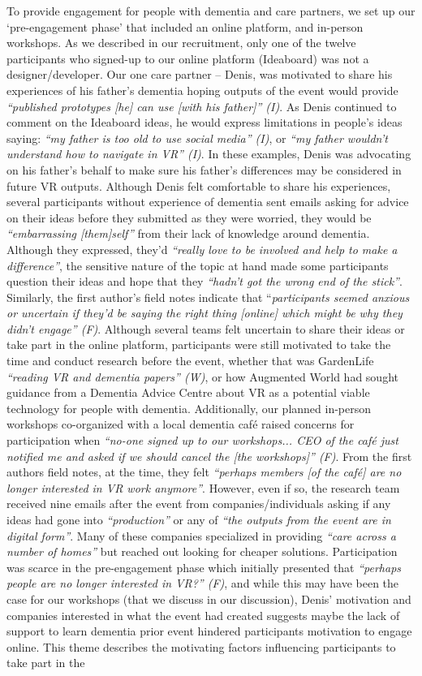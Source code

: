 To provide engagement for people with dementia and care partners, we set up our ‘pre-engagement phase’ that included an online platform, and in-person workshops. As we described in our recruitment, only one of the twelve participants who signed-up to our online platform (Ideaboard) was not a designer/developer. Our one care partner – Denis, was motivated to share his experiences of his father’s dementia hoping outputs of the event would provide \textit{“published prototypes [he] can use [with his father]” (I)}. As Denis continued to comment on the Ideaboard ideas, he would express limitations in people’s ideas saying:\textit{ “my father is too old to use social media” (I)}, or \textit{“my father wouldn’t understand how to navigate in VR” (I)}. In these examples, Denis was advocating on his father’s behalf to make sure his father’s differences may be considered in future VR outputs. Although Denis felt comfortable to share his experiences, several participants without experience of dementia sent emails asking for advice on their ideas before they submitted as they were worried, they would be \textit{“embarrassing [them]self” }from their lack of knowledge around dementia. Although they expressed, they’d \textit{“really love to be involved and help to make a difference”}, the sensitive nature of the topic at hand made some participants question their ideas and hope that they \textit{“hadn’t got the wrong end of the stick”}. Similarly, the first author’s field notes indicate that “\textit{participants seemed anxious or uncertain if they’d be saying the right thing [online] which might be why they didn’t engage” (F)}. Although several teams felt uncertain to share their ideas or take part in the online platform, participants were still motivated to take the time and conduct research before the event, whether that was GardenLife \textit{“reading VR and dementia papers” (W)}, or how Augmented World had sought guidance from a Dementia Advice Centre about VR as a potential viable technology for people with dementia. Additionally, our planned in-person workshops co-organized with a local dementia café raised concerns for participation when \textit{“no-one signed up to our workshops... CEO of the café just notified me and asked if we should cancel the [the workshops]” (F)}. From the first authors field notes, at the time, they felt \textit{“perhaps members [of the café] are no longer interested in VR work anymore”}. However, even if so, the research team received nine emails after the event from companies/individuals asking if any ideas had gone into \textit{“production”} or any of \textit{“the outputs from the event are in digital form”}. Many of these companies specialized in providing \textit{“care across a number of homes”} but reached out looking for cheaper solutions. Participation was scarce in the pre-engagement phase which initially presented that\textit{ “perhaps people are no longer interested in VR?” (F)}, and while this may have been the case for our workshops (that we discuss in our discussion), Denis’ motivation and companies interested in what the event had created suggests maybe the lack of support to learn dementia prior event hindered participants motivation to engage online. This theme describes the motivating factors influencing participants to take part in the 